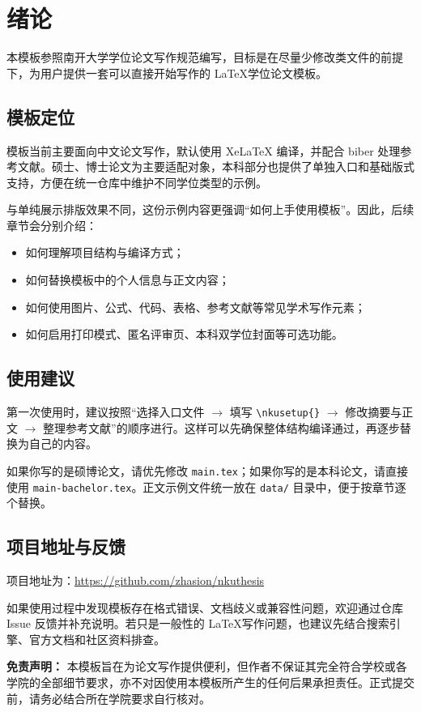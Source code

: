 
\chapter{绪论}

本模板参照南开大学学位论文写作规范编写，目标是在尽量少修改类文件的前提下，为用户提供一套可以直接开始写作的 \LaTeX 学位论文模板。

\section{模板定位}

模板当前主要面向中文论文写作，默认使用 XeLaTeX 编译，并配合 biber 处理参考文献。硕士、博士论文为主要适配对象，本科部分也提供了单独入口和基础版式支持，方便在统一仓库中维护不同学位类型的示例。

与单纯展示排版效果不同，这份示例内容更强调“如何上手使用模板”。因此，后续章节会分别介绍：

\begin{itemize}
    \item 如何理解项目结构与编译方式；
    \item 如何替换模板中的个人信息与正文内容；
    \item 如何使用图片、公式、代码、表格、参考文献等常见学术写作元素；
    \item 如何启用打印模式、匿名评审页、本科双学位封面等可选功能。
\end{itemize}

\section{使用建议}

第一次使用时，建议按照“选择入口文件 $\rightarrow$ 填写 \texttt{\textbackslash nkusetup\{\}} $\rightarrow$ 修改摘要与正文 $\rightarrow$ 整理参考文献”的顺序进行。这样可以先确保整体结构编译通过，再逐步替换为自己的内容。

如果你写的是硕博论文，请优先修改 \texttt{main.tex}；如果你写的是本科论文，请直接使用 \texttt{main-bachelor.tex}。正文示例文件统一放在 \texttt{data/} 目录中，便于按章节逐个替换。

\section{项目地址与反馈}

项目地址为：\url{https://github.com/zhasion/nkuthesis}

如果使用过程中发现模板存在格式错误、文档歧义或兼容性问题，欢迎通过仓库 Issue 反馈并补充说明。若只是一般性的 \LaTeX 写作问题，也建议先结合搜索引擎、官方文档和社区资料排查。

\textbf{免责声明：} 本模板旨在为论文写作提供便利，但作者不保证其完全符合学校或各学院的全部细节要求，亦不对因使用本模板所产生的任何后果承担责任。正式提交前，请务必结合所在学院要求自行核对。
